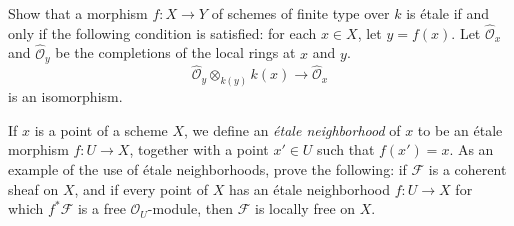 { Show that a morphism $f\colon X\to Y$ of schemes of finite type over $k$ is \'etale if and only if the following condition is satisfied: for each $x\in X$, let $y=f(x)$. Let $\widehat{\mathcal O}_x$ and $\widehat{\mathcal O}_y$ be the completions of the local rings at $x$ and $y$. 
\[
 \widehat{\mathcal O}_y\otimes_{k(y)}k(x)\to\widehat{\mathcal O}_x
\]
is an isomorphism.

 If $x$ is a point of a scheme $X$, we define an \emph{\'etale neighborhood} of $x$ to be an \'etale morphism $f\colon U\to X$, together with a point $x'\in U$ such that $f(x')=x$. As an example of the use of \'etale neighborhoods, prove the following: if $\mathcal F$ is a coherent sheaf on $X$, and if every point of $X$ has an \'etale neighborhood $f\colon U\to X$ for which $f^*\mathcal F$ is a free $\mathcal O_U$-module, then $\mathcal F$ is locally free on $X$.
}
